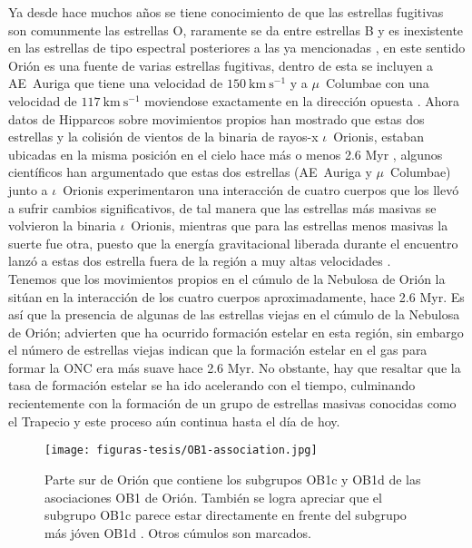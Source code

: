 Ya desde hace muchos años se tiene conocimiento de que las estrellas fugitivas son comunmente las estrellas O, raramente se da entre estrellas B y es inexistente en las estrellas de tipo espectral posteriores a las ya mencionadas \citep{Gies:1986, Gies:1987}, en este sentido Orión es una fuente de varias estrellas fugitivas, dentro de esta se incluyen a AE~Auriga que tiene una velocidad de \(150~\text{km}~\text{s}^{-1}\)  y a \(\mu\)~Columbae con una velocidad de \(117~\text{km}~\text{s}^{-1}\) moviendose exactamente en la dirección opuesta \citep{Blaauw:1991}. Ahora datos de Hipparcos sobre movimientos propios han mostrado que estas dos estrellas y la colisión de vientos de la binaria de rayos-x \(\iota\)~Orionis, estaban ubicadas en la misma posición en el cielo hace más o menos 2.6 Myr \citep{Hoogerwerf:2001}, algunos científicos han argumentado que estas dos estrellas (AE~Auriga y  \(\mu\)~Columbae) junto a \(\iota\)~Orionis experimentaron una interacción de cuatro cuerpos que los llevó a sufrir cambios significativos, de tal manera que las estrellas más masivas se volvieron la binaria \(\iota\)~Orionis, mientras que para las estrellas menos masivas la suerte fue otra, puesto que la energía gravitacional liberada durante el encuentro lanzó a estas dos estrella fuera de la región a muy altas velocidades \citep{Gualandris:2004}.\\   

Tenemos que los movimientos propios en el cúmulo de la Nebulosa de Orión la sitúan en la interacción de los cuatro cuerpos aproximadamente, hace 2.6 Myr. Es así que la presencia de algunas de las estrellas viejas en el cúmulo de la Nebulosa de Orión; advierten que ha ocurrido formación estelar en esta región, sin embargo el número de estrellas viejas indican que la formación estelar en el gas para formar la ONC era más suave hace 2.6 Myr. No obstante, hay que resaltar que la tasa de formación estelar se ha ido acelerando con el tiempo, culminando recientemente con la formación de un grupo de estrellas masivas conocidas como el Trapecio y este proceso aún continua hasta el día de hoy.\\

\begin{figure}
  \centering
  \texttt{[image: figuras-tesis/OB1-association.jpg]}
  \caption{Parte sur de  Orión que contiene los subgrupos OB1c y OB1d de las asociaciones OB1 de Orión. También se logra apreciar que el subgrupo OB1c parece estar directamente en frente del subgrupo más jóven OB1d \citep{Bally:2008a}. Otros cúmulos son marcados.}
  \label{fig:OB1-association}
\end{figure}
  


